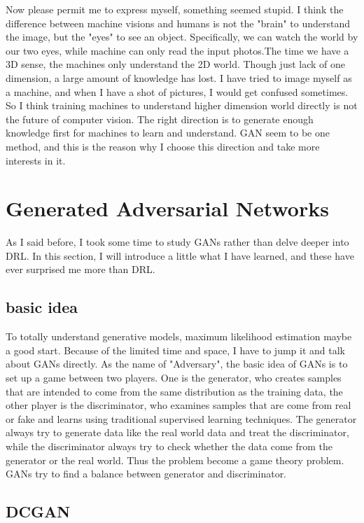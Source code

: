 \documentclass[10pt,twocolumn,letterpaper]{article}
\begin{document}
Now please permit me to express myself, something seemed stupid. I think the difference between machine visions 
and humans is not the "brain" to understand the image, but the "eyes" to see an object. Specifically, we can watch the 
world by our two eyes, while machine can only read the input photos.The time we have a 3D sense, the machines only
understand the 2D world. Though just lack of one dimension, a large amount of knowledge has lost. I have tried to image
myself as a machine, and when I have a shot of pictures, I would get confused sometimes. So I think training machines 
to understand higher dimension world directly is not the future of computer vision. The right direction is to generate enough
knowledge first for machines to learn and understand. GAN seem to be one method, and this is the reason why I choose
this direction and take more interests in it.   

\section{Generated Adversarial Networks}

As I said before, I took some time to study GANs rather than delve deeper into DRL. In this section, I will introduce a little
what I have learned, and these have ever surprised me more than DRL.

\subsection{basic idea}

To totally understand generative models, maximum likelihood estimation maybe a good start. Because of the limited time 
and space, I have to jump it and talk about GANs directly. As the name of "Adversary", the basic idea of GANs is to set up
a game between two players\cite{GAN}. One is the generator, who creates samples that are intended to come from the same 
distribution as the training data, the other player is the discriminator, who examines samples that are come from real or fake and learns using traditional supervised learning techniques. The generator always try to generate data like the real world data and treat the discriminator, while the discriminator always try to check whether the data come from the generator or the real world. Thus the problem become a game theory problem. 
GANs try to find a balance between generator and discriminator.

\subsection{DCGAN}
\end{document}
